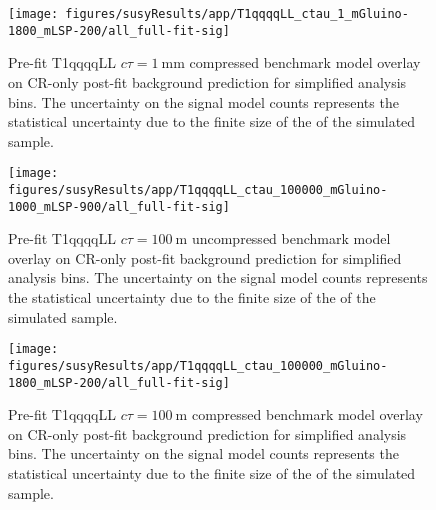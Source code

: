 \begin{figure}[h!]
    \begin{center}
        \texttt{[image: figures/susyResults/app/T1qqqqLL\_ctau\_1\_mGluino-1800\_mLSP-200/all\_full-fit-sig]}
        \caption{
            Pre-fit T1qqqqLL $c\tau=1~\mathrm{mm}$ compressed benchmark
            model overlay on CR-only post-fit background prediction for
            simplified analysis bins. The uncertainty on the signal model counts
            represents the statistical uncertainty due to the finite size of the
            of the simulated sample.
        }
        \label{fig:T1qqqqLL_ctau_1_compressed_MR_simp}
    \end{center}
\end{figure}

\begin{figure}[h!]
    \begin{center}
        \texttt{[image: figures/susyResults/app/T1qqqqLL\_ctau\_100000\_mGluino-1000\_mLSP-900/all\_full-fit-sig]}
        \caption{
            Pre-fit T1qqqqLL $c\tau=100~\mathrm{m}$ uncompressed benchmark
            model overlay on CR-only post-fit background prediction for
            simplified analysis bins. The uncertainty on the signal model counts
            represents the statistical uncertainty due to the finite size of the
            of the simulated sample.
        }
        \label{fig:T1qqqqLL_ctau_100000_uncompressed_MR_simp}
    \end{center}
\end{figure}

\begin{figure}[h!]
    \begin{center}
        \texttt{[image: figures/susyResults/app/T1qqqqLL\_ctau\_100000\_mGluino-1800\_mLSP-200/all\_full-fit-sig]}
        \caption{
            Pre-fit T1qqqqLL $c\tau=100~\mathrm{m}$ compressed benchmark
            model overlay on CR-only post-fit background prediction for
            simplified analysis bins. The uncertainty on the signal model counts
            represents the statistical uncertainty due to the finite size of the
            of the simulated sample.
        }
        \label{fig:T1qqqqLL_ctau_100000_compressed_MR_simp}
    \end{center}
\end{figure}
